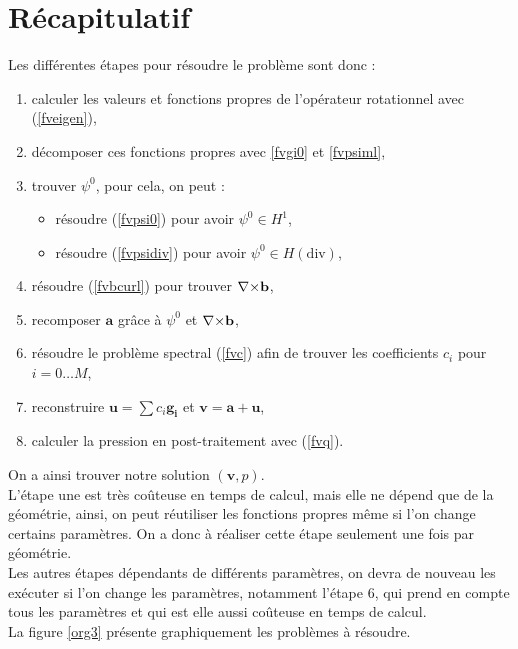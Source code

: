\chapter{Récapitulatif}

Les différentes étapes pour résoudre le problème sont donc :
\begin{enumerate}
\item calculer les valeurs et fonctions propres de l'opérateur rotationnel avec (\ref{fveigen}),
\item décomposer ces fonctions propres avec \ref{fvgi0} et \ref{fvpsiml},
\item trouver $\psi^0$, pour cela, on peut :
\begin{itemize}
\item résoudre (\ref{fvpsi0}) pour avoir $\psi^0\in H^1$,
\item résoudre (\ref{fvpsidiv}) pour avoir $\psi^0\in H(\mathrm{div})$,
\end{itemize}
\item résoudre (\ref{fvbcurl}) pour trouver ${\nabla\times}\mathbf{b}$,
\item recomposer $\mathbf{a}$ grâce à $\psi^0$ et ${\nabla\times}\mathbf{b}$,
\item résoudre le problème spectral (\ref{fvc}) afin de trouver les coefficients $c_i$ pour $i=0\dots M$,
\item reconstruire $\mathbf{u}=\sum c_i \mathbf{g_i}$ et $\mathbf{v}=\mathbf{a}+\mathbf{u}$,
\item calculer la pression en post-traitement avec (\ref{fvq}).
\end{enumerate}

On a ainsi trouver notre solution $(\mathbf{v},p)$.\\
L'étape une est très coûteuse en temps de calcul, mais elle ne dépend que de la géométrie, ainsi, on peut réutiliser les fonctions propres même si l'on change certains paramètres. On a donc à réaliser cette étape seulement une fois par géométrie.\\
Les autres étapes dépendants de différents paramètres, on devra de nouveau les exécuter si l'on change les paramètres, notamment l'étape 6, qui prend en compte tous les paramètres et qui est elle aussi coûteuse en temps de calcul.\\

La figure \ref{org3} présente graphiquement les problèmes à résoudre.\\

